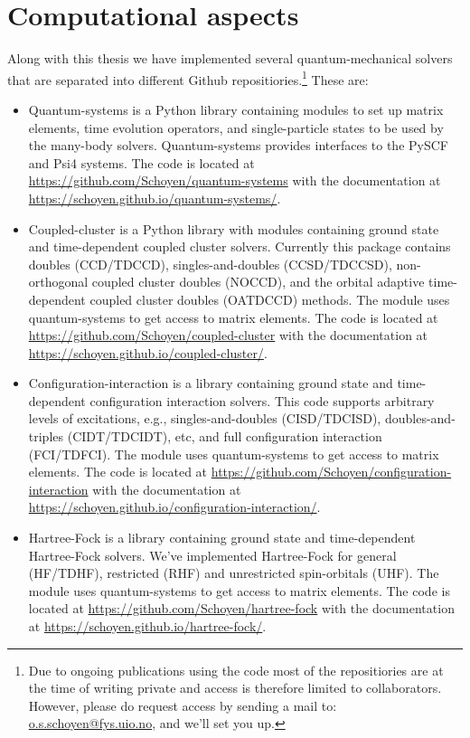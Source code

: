 \chapter{Computational aspects}
    Along with this thesis we have implemented several quantum-mechanical
    solvers that are separated into different Github repositiories.\footnote{%
        Due to ongoing publications using the code most of the repositiories are
        at the time of writing private and access is therefore limited to
        collaborators.
        However, please do request access by sending a mail to:
        \href{mailto:o.s.schoyen@fys.uio.no}{o.s.schoyen@fys.uio.no}, and we'll
        set you up.
    }
    These are:
    \begin{itemize}
        \item Quantum-systems is a Python library containing modules to set up
            matrix elements, time evolution operators, and single-particle
            states to be used by the many-body solvers.
            Quantum-systems provides interfaces to the PySCF \cite{pyscf} and
            Psi4 \cite{psi4} systems.
            The code is located at
            \url{https://github.com/Schoyen/quantum-systems} with the
            documentation at
            \url{https://schoyen.github.io/quantum-systems/}.
        \item Coupled-cluster is a Python library with modules containing ground
            state and time-dependent coupled cluster solvers.
            Currently this package contains doubles (CCD/TDCCD),
            singles-and-doubles (CCSD/TDCCSD), non-orthogonal coupled cluster
            doubles (NOCCD), and the orbital adaptive time-dependent coupled
            cluster doubles (OATDCCD) methods.
            The module uses quantum-systems to get access to matrix elements.
            The code is located at
            \url{https://github.com/Schoyen/coupled-cluster} with the
            documentation at
            \url{https://schoyen.github.io/coupled-cluster/}.
        \item Configuration-interaction is a library containing ground state and
            time-dependent configuration interaction solvers.
            This code supports arbitrary levels of excitations, e.g.,
            singles-and-doubles (CISD/TDCISD), doubles-and-triples
            (CIDT/TDCIDT), etc, and full configuration interaction (FCI/TDFCI).
            The module uses quantum-systems to get access to matrix elements.
            The code is located at
            \url{https://github.com/Schoyen/configuration-interaction} with
            the documentation at
            \url{https://schoyen.github.io/configuration-interaction/}.
        \item Hartree-Fock is a library containing ground state and
            time-dependent Hartree-Fock solvers.
            We've implemented Hartree-Fock for general (HF/TDHF), restricted
            (RHF) and unrestricted spin-orbitals (UHF).
            The module uses quantum-systems to get access to matrix elements.
            The code is located at
            \url{https://github.com/Schoyen/hartree-fock} with
            the documentation at
            \url{https://schoyen.github.io/hartree-fock/}.
    \end{itemize}
